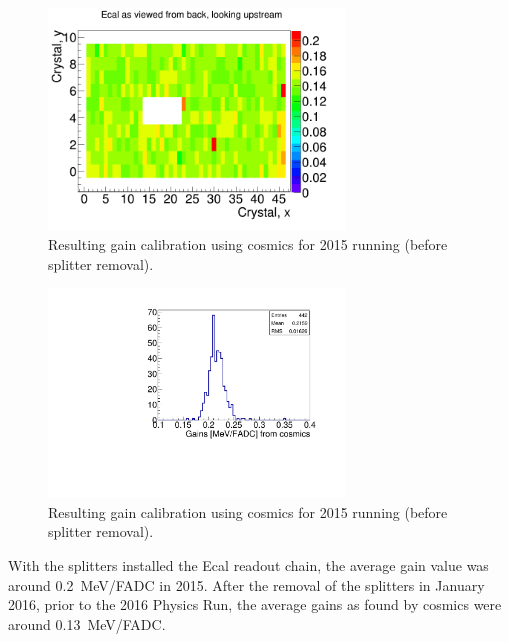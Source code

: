\begin{figure}[H]
  \centering
      \includegraphics[width=0.7\textwidth]{pics/performance/cosmicGains2015.png}
  \caption[Resulting 2015 gain calibration in the Ecal using cosmic ray muons shown by Ecal module position]{Resulting gain calibration using cosmics for 2015 running (before splitter removal).}
  \label{Figure:cosmicG}
\end{figure}


\begin{figure}[H]
  \centering
      \includegraphics[width=0.7\textwidth]{pics/performance/cosmicGainsMay15.pdf}
  \caption[Distribution of the resulting 2015 gains in the Ecal using cosmic ray muons]{Resulting gain calibration using cosmics for 2015 running (before splitter removal).}
  \label{Figure:cosmicGhisto}
\end{figure}

With the splitters installed the Ecal readout chain, the average gain value was around 0.2~MeV/FADC in 2015. After the removal of the splitters in January 2016, prior to the 2016 Physics Run, the average gains as found by cosmics were around 0.13~MeV/FADC.
